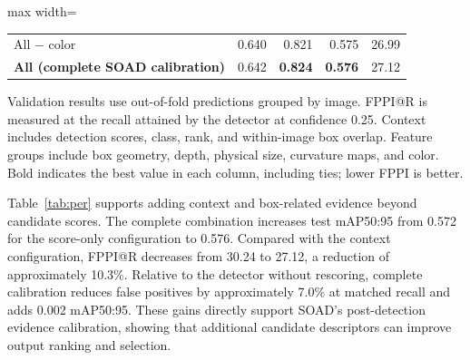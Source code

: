 \documentclass[11pt,a4paper]{article}
\begin{document}
\begin{table}[H]
\begin{adjustbox}{max width=\linewidth}
\begin{tabular}{lrrrr}
All $-$ color & 0.640 & 0.821 & 0.575 & 26.99 \\
\textbf{All (complete SOAD calibration)} & 0.642 & \textbf{0.824} & \textbf{0.576} & 27.12 \\
\bottomrule
\end{tabular}
\end{adjustbox}
\par\vspace{2pt}\parbox{0.97\linewidth}{\footnotesize Validation results use out-of-fold predictions grouped by image. FPPI@R is measured at the recall attained by the detector at confidence 0.25. Context includes detection scores, class, rank, and within-image box overlap. Feature groups include box geometry, depth, physical size, curvature maps, and color. Bold indicates the best value in each column, including ties; lower FPPI is better.}
\end{table}
Table~\ref{tab:per} supports adding context and box-related evidence beyond candidate scores. The complete combination increases test mAP50:95 from 0.572 for the score-only configuration to 0.576. Compared with the context configuration, FPPI@R decreases from 30.24 to 27.12, a reduction of approximately 10.3\%. Relative to the detector without rescoring, complete calibration reduces false positives by approximately 7.0\% at matched recall and adds 0.002 mAP50:95. These gains directly support SOAD's post-detection evidence calibration, showing that additional candidate descriptors can improve output ranking and selection.
\end{document}
